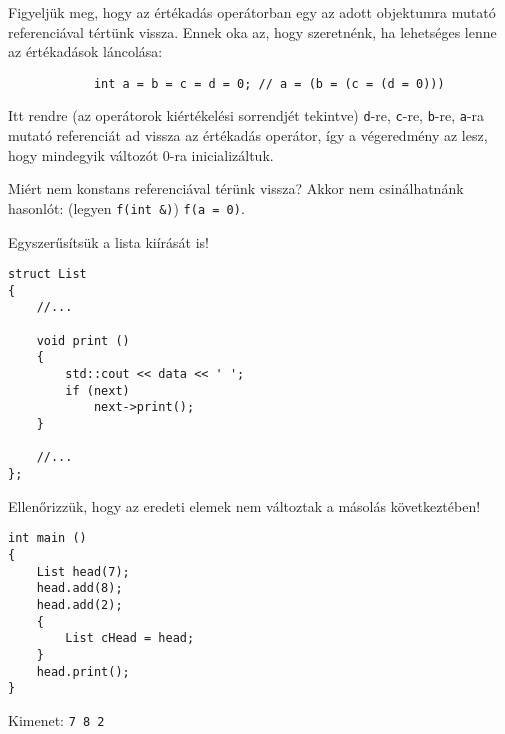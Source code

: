 \documentclass[a4paper,11.5pt,table]{article}
\begin{document}
	Figyeljük meg, hogy az értékadás operátorban egy az adott objektumra mutató referenciával tértünk vissza. Ennek oka az, hogy szeretnénk, ha lehetséges lenne az értékadások láncolása:
	\begin{lstlisting}
			int a = b = c = d = 0; // a = (b = (c = (d = 0)))
	\end{lstlisting}
  Itt rendre (az operátorok kiértékelési sorrendjét tekintve) \texttt{d}-re, \texttt{c}-re, \texttt{b}-re, \texttt{a}-ra mutató referenciát ad vissza az értékadás operátor, így a végeredmény az lesz, hogy mindegyik változót 0-ra inicializáltuk.
	\begin{note}
    Miért nem konstans referenciával térünk vissza? Akkor nem csinálhatnánk hasonlót: (legyen \texttt{f(int \&)}) \texttt{f(a = 0)}.
	\end{note}
	
	Egyszerűsítsük a lista kiírását is!
	\begin{lstlisting}
struct List
{
	//...
	
	void print ()
	{
		std::cout << data << ' ';
		if (next)
			next->print();
	}
	
	//...
};
	\end{lstlisting}
	Ellenőrizzük, hogy az eredeti elemek nem változtak a másolás következtében!
	\begin{lstlisting}
int main ()
{
	List head(7);
	head.add(8);
	head.add(2);
	{
		List cHead = head;
	}
	head.print();
}
	\end{lstlisting}
	Kimenet: \texttt{7 8 2}
	
\end{document}
